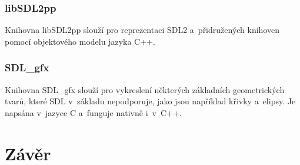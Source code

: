 \subsection*{libSDL2pp}

Knihovna libSDL2pp slouží pro reprezentaci SDL2 a~přidružených knihoven pomocí objektového modelu jazyka C++.

\subsection*{SDL\_gfx}

Knihovna SDL\_gfx slouží pro vykreslení některých základních geometrických tvarů, které SDL v~základu nepodporuje, jako jsou například křivky a~elipsy. Je napsána v~jazyce C a~funguje nativně i~v~C++.


\chapter{Závěr}

